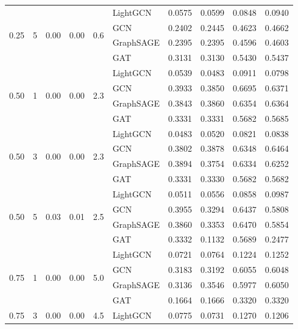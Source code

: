 {\begin{longtable}{cccccl rrrr}
\midrule
\multirow{4}{*}{0.25} & \multirow{4}{*}{5} & \multirow{4}{*}{0.00} & \multirow{4}{*}{0.00} & \multirow{4}{*}{0.6} & LightGCN & 0.0575 & 0.0599 & 0.0848 & 0.0940 \\
 & & & & & GCN & 0.2402 & 0.2445 & 0.4623 & 0.4662 \\
 & & & & & GraphSAGE & 0.2395 & 0.2395 & 0.4596 & 0.4603 \\
 & & & & & GAT & 0.3131 & 0.3130 & 0.5430 & 0.5437 \\
\midrule
\multirow{4}{*}{0.50} & \multirow{4}{*}{1} & \multirow{4}{*}{0.00} & \multirow{4}{*}{0.00} & \multirow{4}{*}{2.3} & LightGCN & 0.0539 & 0.0483 & 0.0911 & 0.0798 \\
 & & & & & GCN & 0.3933 & 0.3850 & 0.6695 & 0.6371 \\
 & & & & & GraphSAGE & 0.3843 & 0.3860 & 0.6354 & 0.6364 \\
 & & & & & GAT & 0.3331 & 0.3331 & 0.5682 & 0.5685 \\
\midrule
\multirow{4}{*}{0.50} & \multirow{4}{*}{3} & \multirow{4}{*}{0.00} & \multirow{4}{*}{0.00} & \multirow{4}{*}{2.3} & LightGCN & 0.0483 & 0.0520 & 0.0821 & 0.0838 \\
 & & & & & GCN & 0.3802 & 0.3878 & 0.6348 & 0.6464 \\
 & & & & & GraphSAGE & 0.3894 & 0.3754 & 0.6334 & 0.6252 \\
 & & & & & GAT & 0.3331 & 0.3330 & 0.5682 & 0.5682 \\
\midrule
\multirow{4}{*}{0.50} & \multirow{4}{*}{5} & \multirow{4}{*}{0.03} & \multirow{4}{*}{0.01} & \multirow{4}{*}{2.5} & LightGCN & 0.0511 & 0.0556 & 0.0858 & 0.0987 \\
 & & & & & GCN & 0.3955 & 0.3294 & 0.6437 & 0.5808 \\
 & & & & & GraphSAGE & 0.3860 & 0.3353 & 0.6470 & 0.5854 \\
 & & & & & GAT & 0.3332 & 0.1132 & 0.5689 & 0.2477 \\
\midrule
\multirow{4}{*}{0.75} & \multirow{4}{*}{1} & \multirow{4}{*}{0.00} & \multirow{4}{*}{0.00} & \multirow{4}{*}{5.0} & LightGCN & 0.0721 & 0.0764 & 0.1224 & 0.1252 \\
 & & & & & GCN & 0.3183 & 0.3192 & 0.6055 & 0.6048 \\
 & & & & & GraphSAGE & 0.3136 & 0.3546 & 0.5977 & 0.6050 \\
 & & & & & GAT & 0.1664 & 0.1666 & 0.3320 & 0.3320 \\
\midrule
\multirow{4}{*}{0.75} & \multirow{4}{*}{3} & \multirow{4}{*}{0.00} & \multirow{4}{*}{0.00} & \multirow{4}{*}{4.5} & LightGCN & 0.0775 & 0.0731 & 0.1270 & 0.1206 \\

\end{longtable}}
